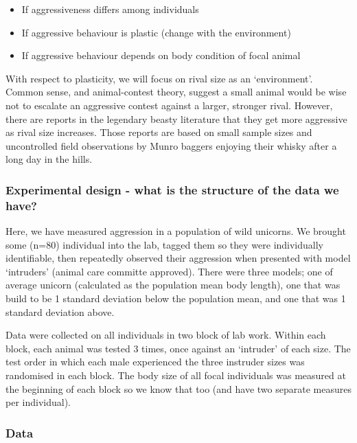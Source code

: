 \documentclass[
  12pt,
]{book}
\providecommand{\tightlist}{%
  \setlength{\itemsep}{0pt}\setlength{\parskip}{0pt}}
\begin{document}
\begin{itemize}
\tightlist
\item
  If aggressiveness differs among individuals
\item
  If aggressive behaviour is plastic (change with the environment)
\item
  If aggressive behaviour depends on body condition of focal animal
\end{itemize}

With respect to plasticity, we will focus on rival size as an `environment'. Common sense, and animal-contest theory, suggest a small animal would be wise not to escalate an aggressive contest against a larger, stronger rival. However, there are reports in the legendary beasty literature that they get more aggressive as rival size increases. Those reports are based on small sample sizes and uncontrolled field observations by Munro baggers enjoying their whisky after a long day in the hills.

\hypertarget{experimental-design---what-is-the-structure-of-the-data-we-have}{%
\subsubsection{Experimental design - what is the structure of the data we have?}\label{experimental-design---what-is-the-structure-of-the-data-we-have}}

Here, we have measured aggression in a population of wild unicorns. We brought some (n=80) individual into the lab, tagged them so they were individually identifiable, then repeatedly observed their aggression when presented with model `intruders' (animal care committe approved). There were three models; one of average unicorn (calculated as the population mean body length), one that was build to be 1 standard deviation below the population mean, and one that was 1 standard deviation above.

Data were collected on all individuals in two block of lab work. Within each block, each animal was tested 3 times, once against an `intruder' of each size. The test order in which each male experienced the three instruder sizes was randomised in each block. The body size of all focal individuals was measured at the beginning of each block so we know that too (and have two separate measures per individual).

\hypertarget{data}{%
\subsubsection{Data}\label{data}}
\end{document}
